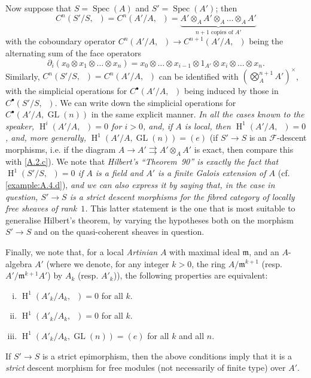 \documentclass{article}
\theoremstyle{plain}
\theoremstyle{definition}
\newenvironment{example}[1]
  {\renewcommand\theinnercustomexample{#1}\innercustomexample}
  {\endinnercustomexample}
\newcommand{\sh}[1]{{\mathscr{#1}}}
\newcommand{\fk}[1]{{\mathfrak{#1}}}
\DeclareMathOperator{\HH}{H}
\DeclareMathOperator{\GL}{GL}
\DeclareMathOperator{\Ga}{G_a}
\DeclareMathOperator{\Gm}{G_m}
\DeclareMathOperator{\Spec}{Spec}
\newcommand{\oldpage}[1]{\marginpar{\footnotesize$\Big\vert$ \textit{p.~#1}}}
\begin{document}
\begin{example}{2}
  Now suppose that $S=\Spec(A)$ and $S'=\Spec(A')$;
  then
  \[
    C^n(S'/S,\Ga)
    = C^n(A'/A,\Ga)
    = \underbrace{A'\otimes_A A'\otimes_A\ldots\otimes_A A'}_{\mbox{$n+1$ copies of $A'$}}
  \]
  with the coboundary operator $C^n(A'/A,\Ga)\to C^{n+1}(A'/A,\Ga)$ being the alternating sum of the face operators
  \[
    \partial_i(x_0\otimes x_1\otimes\ldots\otimes x_n)
    = x_0\otimes\ldots\otimes x_{i-1}\otimes1_{A'}\otimes x_i\otimes\ldots\otimes x_n.
  \]
  Similarly, $C^n(S'/S,\Gm)=C^n(A'/A,\Gm)$ can be identified with $(\bigotimes_A^{n+1}A')^\times$, with the simplicial operations for $C^\bullet(A'/A,\Gm)$ being induced by those in $C^\bullet(S'/S,\Ga)$.
  We can write down the simplicial operations for $C^\bullet(A'/A,\GL(n))$ in the same explicit manner.
  \emph{In all the cases known to the speaker, $\HH^i(A'/A,\Ga)=0$ for $i>0$, and, if $A$ is local, then $\HH^1(A'/A,\Gm)=0$, and, more generally, $\HH^1(A'/A,\GL(n))=(e)$} (if $S'\to S$ is an $\sh{F}$-descent morphisms, i.e. if the diagram $A\to A'\rightrightarrows A'\otimes_A A'$ is exact, then compare this with \cref{A.2.c}).
  We note that \emph{Hilbert's ``Theorem~90'' is exactly the fact that}
\oldpage{190-16}
  \emph{$\HH^1(S'/S,\Gm)=0$ if $A$ is a field and $A'$ is a finite Galois extension of $A$} (cf. \cref{example:A.4.d}), \emph{and we can also express it by saying that, in the case in question, $S'\to S$ is a strict descent morphisms for the fibred category of locally free sheaves of rank~$1$.}
  This latter statement is the one that is most suitable to generalise Hilbert's theorem, by varying the hypotheses both on the morphism $S'\to S$ and on the quasi-coherent sheaves in question.

  Finally, we note that, for a local \emph{Artinian} $A$ with maximal ideal $\fk{m}$, and an $A$-algebra $A'$ (where we denote, for any integer $k>0$, the ring $A/\fk{m}^{k+1}$ (resp. $A'/\fk{m}^{k+1}A'$) by $A_k$ (resp. $A'_k$)), the following properties are equivalent:
  \begin{enumerate}[(i)]
    \item $\HH^1(A'_k/A_k,\Ga)=0$ for all $k$.
    \item $\HH^1(A'_k/A_k,\Gm)=0$ for all $k$.
    \item $\HH^1(A'_k/A_k,\GL(n))=(e)$ for all $k$ and all $n$.
  \end{enumerate}

  If $S'\to S$ is a strict epimorphism, then the above conditions imply that it is a \emph{strict} descent morphism for free modules (not necessarily of finite type) over $A'$.
\end{example}
\end{document}
